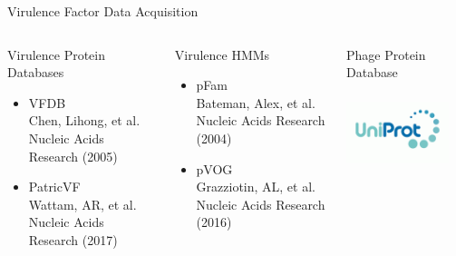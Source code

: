 \documentclass[11pt]{beamer}
\begin{document}
	\begin{frame}{Virulence Factor Data Acquisition}
	\begin{columns}
	\begin{block}{Virulence Protein Databases}
		\begin{itemize}
			\item VFDB \\ \tiny{Chen, Lihong, et al. Nucleic Acids Research (2005)}
			\item \large{PatricVF} \\ \tiny{Wattam, AR, et al. Nucleic Acids Research (2017)}
		\end{itemize}
	\end{block}
	\begin{block}{Virulence HMMs}
	\begin{itemize}
		\item pFam \\ \tiny{Bateman, Alex, et al. Nucleic Acids Research (2004)}
		\item \large{pVOG} \\ \tiny{Grazziotin, AL, et al. Nucleic Acids Research (2016)}
	\end{itemize}
		
	\end{block}
	
	
	\begin{block}{Phage Protein Database}
	\includegraphics[height=3cm, width=3cm]{uniprot.png}
	\end{block}
	\end{columns}
	\end{frame}
\end{document}
